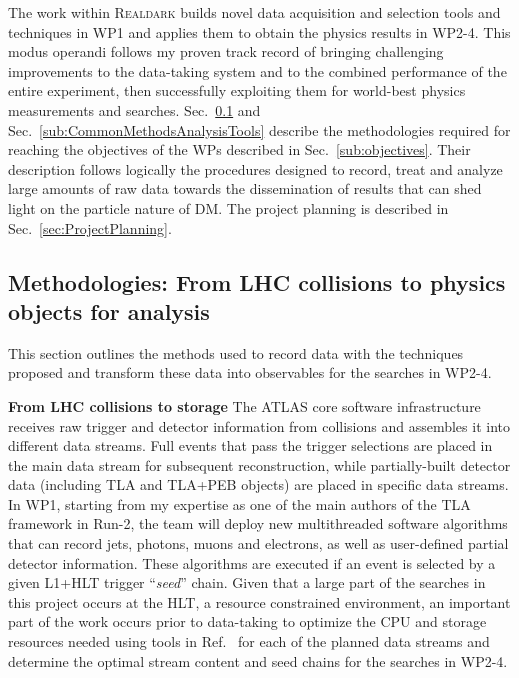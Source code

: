 The work within \textsc{Realdark} builds novel data acquisition and selection tools and techniques in WP1 and applies them to obtain the physics results in WP2-4. This modus operandi follows my proven track record of bringing challenging improvements to the data-taking system and to the combined performance of the entire experiment, then successfully exploiting them for world-best physics measurements and searches. 
Sec.~\ref{subsub:TriggerRecoSoftware} and Sec.~\ref{sub:CommonMethodsAnalysisTools} describe the methodologies required for reaching the objectives of the WPs described in Sec.~\ref{sub:objectives}. 
Their description follows logically the procedures designed to record, treat and analyze large amounts of raw data towards the dissemination of results that can shed light on the particle nature of DM. %
The project planning is described in Sec.~\ref{sec:ProjectPlanning}.  

\subsection{Methodologies: From LHC collisions to physics objects for analysis}
\label{subsub:TriggerRecoSoftware}

This section outlines the methods used to record data with the techniques proposed 
and transform these data into observables for the searches in WP2-4. 

\textbf{From LHC collisions to storage} The ATLAS core software infrastructure receives raw trigger and detector information from collisions and assembles it into different data streams. 
Full events that pass the trigger selections are placed in the main data stream for subsequent reconstruction, while partially-built detector data (including TLA and TLA+PEB objects) are placed in specific data streams. 
In WP1, starting from my expertise as one of the main authors of the TLA framework in Run-2, the team will deploy new multithreaded software algorithms that can record jets, photons, muons and electrons, as well as user-defined partial detector information. 
These algorithms are executed if an event is selected by a given L1+HLT trigger ``\textit{seed}'' chain. 
Given that a large part of the searches in this project occurs at the HLT, a resource constrained environment, an important part of the work occurs prior to data-taking to optimize the CPU and storage resources needed using tools in Ref.~\cite{Martin:2229583} for each of the planned data streams %
and determine the optimal stream content and seed chains for the searches in WP2-4. 

